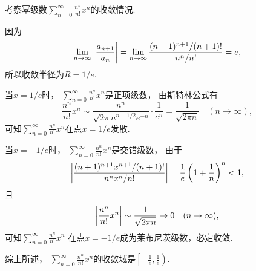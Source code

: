 \begin{example}
考察幂级数\(\sum_{n=0}^\infty \frac{n^n}{n!} x^n\)的收敛情况.
\begin{solution}
因为\[
	\lim_{n\to\infty} \abs{\frac{a_{n+1}}{a_n}}
	= \lim_{n\to\infty} \frac{(n+1)^{n+1} / (n+1)!}{n^n / n!}
	= e,
\]
所以收敛半径为\(R=1/e\).

当\(x=1/e\)时，
\(\sum_{n=0}^\infty \frac{n^n}{n!} x^n\)是正项级数，
由\hyperref[equation:定积分.伽马函数的斯特林近似]{斯特林公式}有\[
	\frac{n^n}{n!} x^n
	\sim
	\frac{n^n}{\sqrt{2\pi} n^{n+1/2} e^{-n}} \cdot \frac1{e^n}
	= \frac1{\sqrt{2\pi n}}
	\quad(n\to\infty),
\]
可知\(\sum_{n=0}^\infty \frac{n^n}{n!} x^n\)在点\(x=1/e\)发散.

当\(x=-1/e\)时，
\(\sum_{n=0}^\infty \frac{n^n}{n!} x^n\)是交错级数，
由于\[
	\abs{\frac{(n+1)^{n+1} x^{n+1} / (n+1)!}{n^n x^n / n!}}
	= \frac1e \left( 1 + \frac1n \right)^n
	< 1,
\]
且\[
	\abs{\frac{n^n}{n!} x^n}
	\sim
	\frac1{\sqrt{2\pi n}}
	\to 0
	\quad(n\to\infty),
\]
可知\(\sum_{n=0}^\infty \frac{n^n}{n!} x^n\)
在点\(x=-1/e\)成为莱布尼茨级数，必定收敛.

综上所述，
\(\sum_{n=0}^\infty \frac{n^n}{n!} x^n\)的收敛域是\(\left[-\frac1e,\frac1e\right)\).
\end{solution}
\end{example}

